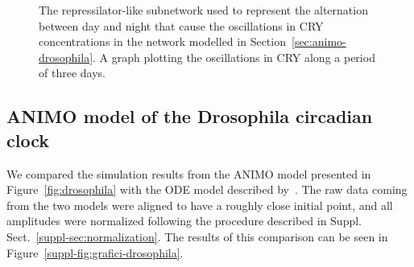 \begin{figure}[!htb]
\begin{minipage}{\textwidth}
  \centering
  \qquad
\caption{{\bf \protect{}} The repressilator-like subnetwork used to represent the alternation
between day and night that cause the oscillations in {\sf CRY} concentrations in the
network modelled in Section~\ref{sec:animo-drosophila}.
{\bf \protect{}} A graph plotting the oscillations in {\sf CRY} along
a period of three days.}\label{fig:repressilator}
\end{minipage}
\end{figure}


\subsection{ANIMO model of the Drosophila circadian clock}\label{suppl-sec:animo-drosophila}
We compared the simulation results from the ANIMO model presented in Figure~\ref{fig:drosophila}
with the ODE model described by~\citet{drosophila-ode-model}. The raw data coming from the
two models were aligned to have a roughly close initial point, and all amplitudes were normalized
following the procedure described in Suppl. Sect.~\ref{suppl-sec:normalization}. The results
of this comparison can be seen in Figure~\ref{suppl-fig:grafici-drosophila}.

